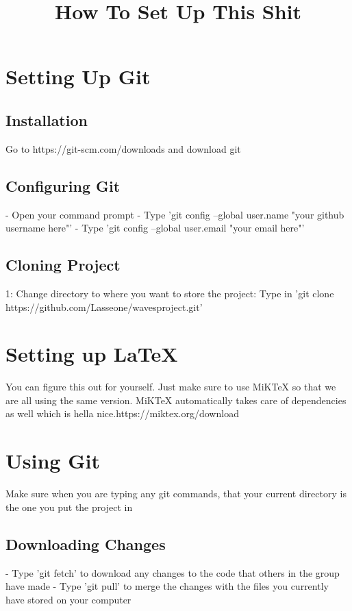 \documentclass{article}
\title{How To Set Up This Shit}
\begin{document}
\section{Setting Up Git}
	\subsection{Installation}
		Go to https://git-scm.com/downloads and download git
		
	\subsection{Configuring Git}
		- Open your command prompt\newline\newline
		- Type 'git config --global user.name "your github username here"'\newline\newline
		- Type 'git config --global user.email "your email here"'
	
	\subsection{Cloning Project}
		1: Change directory to where you want to store the project\newline{}: Type in 'git clone https://github.com/Lasseone/waves\textunderscore project.git'

\section{Setting up LaTeX}
You can figure this out for yourself. Just make sure to use MiKTeX so that we are all using the same version. MiKTeX automatically takes care of dependencies as well which is hella nice.\newline https://miktex.org/download

\section{Using Git}
Make sure when you are typing any git commands, that your current directory is the one you put the project in

\subsection{Downloading Changes}
- Type 'git fetch' to download any changes to the code that others in the group have made\newline\newline
- Type 'git pull' to merge the changes with the files you currently have stored on your computer\newline
\end{document}
